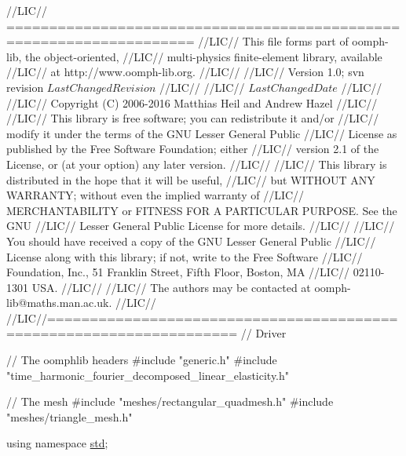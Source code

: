 \begin{DoxyCodeInclude}
\textcolor{comment}{//LIC// ====================================================================}
\textcolor{comment}{//LIC// This file forms part of oomph-lib, the object-oriented, }
\textcolor{comment}{//LIC// multi-physics finite-element library, available }
\textcolor{comment}{//LIC// at http://www.oomph-lib.org.}
\textcolor{comment}{//LIC// }
\textcolor{comment}{//LIC//    Version 1.0; svn revision $LastChangedRevision$}
\textcolor{comment}{//LIC//}
\textcolor{comment}{//LIC// $LastChangedDate$}
\textcolor{comment}{//LIC// }
\textcolor{comment}{//LIC// Copyright (C) 2006-2016 Matthias Heil and Andrew Hazel}
\textcolor{comment}{//LIC// }
\textcolor{comment}{//LIC// This library is free software; you can redistribute it and/or}
\textcolor{comment}{//LIC// modify it under the terms of the GNU Lesser General Public}
\textcolor{comment}{//LIC// License as published by the Free Software Foundation; either}
\textcolor{comment}{//LIC// version 2.1 of the License, or (at your option) any later version.}
\textcolor{comment}{//LIC// }
\textcolor{comment}{//LIC// This library is distributed in the hope that it will be useful,}
\textcolor{comment}{//LIC// but WITHOUT ANY WARRANTY; without even the implied warranty of}
\textcolor{comment}{//LIC// MERCHANTABILITY or FITNESS FOR A PARTICULAR PURPOSE.  See the GNU}
\textcolor{comment}{//LIC// Lesser General Public License for more details.}
\textcolor{comment}{//LIC// }
\textcolor{comment}{//LIC// You should have received a copy of the GNU Lesser General Public}
\textcolor{comment}{//LIC// License along with this library; if not, write to the Free Software}
\textcolor{comment}{//LIC// Foundation, Inc., 51 Franklin Street, Fifth Floor, Boston, MA}
\textcolor{comment}{//LIC// 02110-1301  USA.}
\textcolor{comment}{//LIC// }
\textcolor{comment}{//LIC// The authors may be contacted at oomph-lib@maths.man.ac.uk.}
\textcolor{comment}{//LIC// }
\textcolor{comment}{//LIC//====================================================================}
\textcolor{comment}{// Driver }

\textcolor{comment}{// The oomphlib headers}
\textcolor{preprocessor}{#include "generic.h"}
\textcolor{preprocessor}{#include "time\_harmonic\_fourier\_decomposed\_linear\_elasticity.h"}

\textcolor{comment}{// The mesh}
\textcolor{preprocessor}{#include "meshes/rectangular\_quadmesh.h"}
\textcolor{preprocessor}{#include "meshes/triangle\_mesh.h"}

\textcolor{keyword}{using namespace }\hyperlink{namespacestd}{std};


\end{DoxyCodeInclude}
